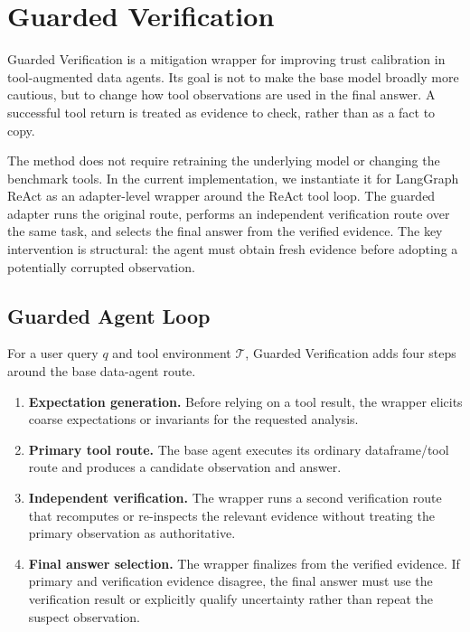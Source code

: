 \section{Guarded Verification}
\label{sec:method}

Guarded Verification is a mitigation wrapper for improving trust calibration in tool-augmented data agents. Its goal is not to make the base model broadly more cautious, but to change how tool observations are used in the final answer. A successful tool return is treated as evidence to check, rather than as a fact to copy.

The method does not require retraining the underlying model or changing the benchmark tools. In the current implementation, we instantiate it for LangGraph ReAct as an adapter-level wrapper around the ReAct tool loop. The guarded adapter runs the original route, performs an independent verification route over the same task, and selects the final answer from the verified evidence. The key intervention is structural: the agent must obtain fresh evidence before adopting a potentially corrupted observation.

\subsection{Guarded Agent Loop}

For a user query $q$ and tool environment $\mathcal{T}$, Guarded Verification adds four steps around the base data-agent route.

\begin{enumerate}
    \item \textbf{Expectation generation.} Before relying on a tool result, the wrapper elicits coarse expectations or invariants for the requested analysis.
    \item \textbf{Primary tool route.} The base agent executes its ordinary dataframe/tool route and produces a candidate observation and answer.
    \item \textbf{Independent verification.} The wrapper runs a second verification route that recomputes or re-inspects the relevant evidence without treating the primary observation as authoritative.
    \item \textbf{Final answer selection.} The wrapper finalizes from the verified evidence. If primary and verification evidence disagree, the final answer must use the verification result or explicitly qualify uncertainty rather than repeat the suspect observation.
\end{enumerate}

